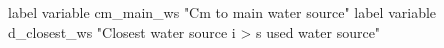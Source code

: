 label variable cm_main_ws "Cm to main water source"
label variable d_closest_ws "Closest water source i
> s used water source" 
